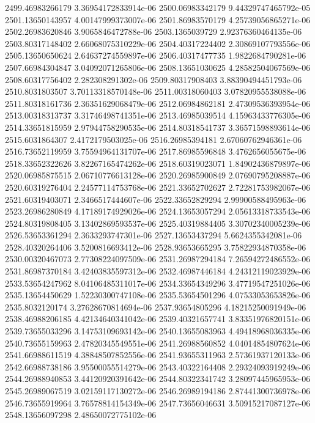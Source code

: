 {2499.46983266179 3.36954172833914e-06
2500.06983342179 9.44329747465792e-05
2501.13650143957 4.00147999373007e-06
2501.86983570179 4.25739056865271e-06
2502.26983620846 3.9065846472788e-06
2503.1365039729 2.92376360464135e-06
2503.80317148402 2.66068075310229e-06
2504.40317224402 2.30869107793556e-06
2505.13650650624 2.64637274559897e-06
2506.40317477735 1.9822684790281e-06
2507.66984304847 3.04092071265806e-06
2508.13651030625 4.28582504067569e-06
2508.60317756402 2.282308291302e-06
2509.80317908403 3.88390494451793e-06
2510.8031803507 3.70113318570148e-06
2511.00318060403 3.07820955538088e-06
2511.80318161736 2.36351629068479e-06
2512.06984862181 2.47309536393954e-06
2513.00318313737 3.31746498741351e-06
2513.46985039514 4.15963433776305e-06
2514.33651815959 2.97944758290535e-06
2514.80318541737 3.36571598893614e-06
2515.6031864307 2.4172179503025e-06
2516.26985394181 2.67060762946361e-06
2516.73652119959 3.75594964131707e-06
2517.86985596848 3.4762656055675e-06
2518.33652322626 3.82267165474262e-06
2518.60319023071 1.84902436879897e-06
2520.06985875515 2.06710776613128e-06
2520.26985900849 2.07690795208887e-06
2520.60319276404 2.24577114753768e-06
2521.33652702627 2.72281753982067e-06
2521.60319403071 2.3466517444607e-06
2522.33652829294 2.99900588495963e-06
2523.26986280849 4.17189174929026e-06
2524.13653057294 2.05613318733543e-06
2524.80319808405 3.13402869593537e-06
2525.40319884405 3.30702340005239e-06
2526.53653361294 2.3633293747301e-06
2527.13653437294 5.6624355342081e-06
2528.40320264406 3.5200816693412e-06
2528.93653665295 3.75822934870358e-06
2530.00320467073 2.77308224097509e-06
2531.26987294184 7.26594272486552e-06
2531.86987370184 3.42403835597312e-06
2532.46987446184 4.24312119023929e-06
2533.53654247962 8.04106485311017e-06
2534.33654349296 3.47719547251026e-06
2535.13654450629 1.52230300747108e-06
2535.53654501296 4.07533053653826e-06
2535.8032120174 3.27628670814694e-06
2537.93654805296 4.18215250091949e-06
2538.46988206185 4.42134640341042e-06
2539.40321657741 3.83351976820151e-06
2539.73655033296 3.14753109693142e-06
2540.13655083963 4.49418968036335e-06
2540.73655159963 2.47820345549551e-06
2541.26988560852 4.04014854807624e-06
2541.66988611519 4.38848507852556e-06
2541.93655311963 2.57361937120133e-06
2542.66988738186 3.95500055514279e-06
2543.40322164408 2.29324093919249e-06
2544.26988940853 3.44120920391642e-06
2544.80322341742 3.28097445965953e-06
2545.26989067519 3.02159117130272e-06
2546.26989194186 2.87441300736978e-06
2546.73655919964 3.76578814154349e-06
2547.73656046631 3.50915217087127e-06
2548.13656097298 2.48650072775102e-06
}
